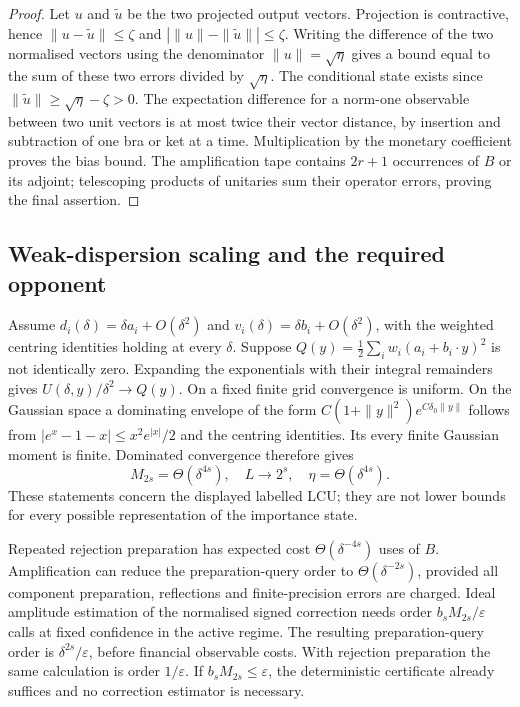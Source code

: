 \begin{proof}
Let $u$ and $\widetilde u$ be the two projected output vectors.
Projection is contractive, hence
$\|u-\widetilde u\|\leq\zeta$ and
$|\|u\|-\|\widetilde u\||\leq\zeta$.
Writing the difference of the two normalised vectors using the
denominator $\|u\|=\sqrt\eta$ gives a bound equal to the sum of these
two errors divided by $\sqrt\eta$. The conditional state exists since
$\|\widetilde u\|\geq\sqrt\eta-\zeta>0$.
The expectation difference for a norm-one observable between two unit
vectors is at most twice their vector distance, by insertion and
subtraction of one bra or ket at a time. Multiplication by the monetary
coefficient proves the bias bound. The amplification tape contains
$2r+1$ occurrences of $B$ or its adjoint; telescoping products of
unitaries sum their operator errors, proving the final assertion.
\end{proof}

\subsection{Weak-dispersion scaling and the required opponent}

Assume $d_i(\delta)=\delta a_i+O(\delta^2)$ and
$v_i(\delta)=\delta b_i+O(\delta^2)$, with the weighted centring
identities holding at every $\delta$. Suppose
$Q(y)=\tfrac12\sum_iw_i(a_i+b_i\cdot y)^2$ is not identically zero.
Expanding the exponentials with their integral remainders gives
$U(\delta,y)/\delta^2\to Q(y)$. On a fixed finite grid convergence
is uniform. On the Gaussian space a dominating envelope of the form
$C(1+\|y\|^2)e^{C\delta_0\|y\|}$ follows from
$|e^x-1-x|\leq x^2e^{|x|}/2$ and the centring identities.
Its every finite Gaussian moment is finite. Dominated convergence
therefore gives
\[
 M_{2s}=\Theta(\delta^{4s}),\quad
 L\longrightarrow2^s,\quad
 \eta=\Theta(\delta^{4s}).
\]
These statements concern the displayed labelled LCU; they are not
lower bounds for every possible representation of the importance state.

Repeated rejection preparation has expected cost $\Theta(\delta^{-4s})$
uses of $B$. Amplification can reduce the preparation-query order to
$\Theta(\delta^{-2s})$, provided all component preparation,
reflections and finite-precision errors are charged. Ideal amplitude
estimation of the normalised signed correction needs order
$b_sM_{2s}/\varepsilon$ calls at fixed confidence in the active regime.
The resulting preparation-query order is
$\delta^{2s}/\varepsilon$, before financial observable costs.
With rejection preparation the same calculation is order
$1/\varepsilon$. If $b_sM_{2s}\leq\varepsilon$, the deterministic
certificate already suffices and no correction estimator is necessary.

